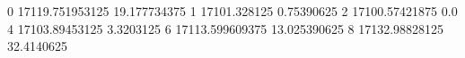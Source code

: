 0 17119.751953125 19.177734375
1 17101.328125 0.75390625
2 17100.57421875 0.0
4 17103.89453125 3.3203125
6 17113.599609375 13.025390625
8 17132.98828125 32.4140625
